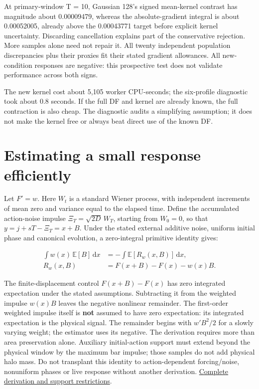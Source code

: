 \documentclass[fleqn,usenatbib]{mnras}
\begin{document}
At primary-window T = 10, Gaussian 128's signed mean-kernel contrast has magnitude about 0.00009479, whereas the absolute-gradient integral is about 0.00052005, already above the 0.00043771 target before explicit kernel uncertainty. Discarding cancellation explains part of the conservative rejection. More samples alone need not repair it. All twenty independent population discrepancies plus their proxies fit their stated gradient allowances. All new-condition responses are negative: this prospective test does not validate performance across both signs.

The new kernel cost about 5,105 worker CPU-seconds; the six-profile diagnostic took about 0.8 seconds. If the full DF and kernel are already known, the full contraction is also cheap. The diagnostic audits a simplifying assumption; it does not make the kernel free or always beat direct use of the known DF.

\section{Estimating a small response efficiently}\label{estimator}

Let \(F'=w\). Here \(W_t\) is a standard Wiener process, with independent increments of mean zero and variance equal to the elapsed time. Define the accumulated action-noise impulse \(\Xi_T=\sqrt{2D}\,W_T\), starting from \(W_0=0\), so that \(y=j+sT-\Xi_T=x+B\). Under the stated external additive noise, uniform initial phase and canonical evolution, a zero-integral primitive identity gives:

\begin{equation}\label{EQ-EST-01}
\begin{aligned}
\int w(x)\,\mathbb E[B]\,\mathrm dx
&=-\int\mathbb E\!\left[R_w(x,B)\right]\,\mathrm dx,\\
R_w(x,B)&=F(x+B)-F(x)-w(x)B.
\end{aligned}
\end{equation}

The finite-displacement control \(F(x+B)-F(x)\) has zero integrated expectation under the stated assumptions. Subtracting it from the weighted impulse \(w(x)B\) leaves the negative nonlinear remainder. The first-order weighted impulse itself is \textbf{not} assumed to have zero expectation: its integrated expectation is the physical signal. The remainder begins with \(w'B^2/2\) for a slowly varying weight; the estimator uses its negative. The derivation requires more than area preservation alone. Auxiliary initial-action support must extend beyond the physical window by the maximum bar impulse; those samples do not add physical halo mass. Do not transplant this identity to action-dependent forcing/noise, nonuniform phases or live response without another derivation. \href{https://djova.ca/galaxy-bar/methods/CUMULATIVE_IDENTITY.md}{Complete derivation and support restrictions}.
\end{document}
